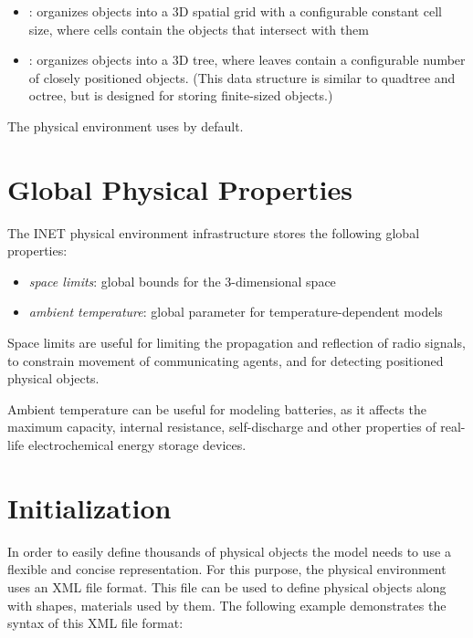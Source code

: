 \begin{itemize}
  \item {}: organizes objects into a 3D spatial grid with
    a configurable constant cell size, where cells contain the objects that
    intersect with them
  \item {}: organizes objects into a 3D tree, where
    leaves contain a configurable number of closely positioned objects.
    (This data structure is similar to quadtree and octree, but is designed for
    storing finite-sized objects.)
\end{itemize}

The physical environment uses  by default.

\section{Global Physical Properties}

The INET physical environment infrastructure stores the following global
properties:

\begin{itemize}
  \item \textit{space limits}: global bounds for the 3-dimensional space
  \item \textit{ambient temperature}: global parameter for temperature-dependent models
\end{itemize}

Space limits are useful for limiting the propagation and reflection of
radio signals, to constrain movement of communicating agents, and for
detecting positioned physical objects.

Ambient temperature can be useful for modeling batteries, as it affects the
maximum capacity, internal resistance, self-discharge and other properties
of real-life electrochemical energy storage devices.

\section{Initialization}

In order to easily define thousands of physical objects the model needs to use a
flexible and concise representation. For this purpose, the physical environment
uses an XML file format. This file can be used to define physical objects along
with shapes, materials used by them. The following example demonstrates the
syntax of this XML file format:

